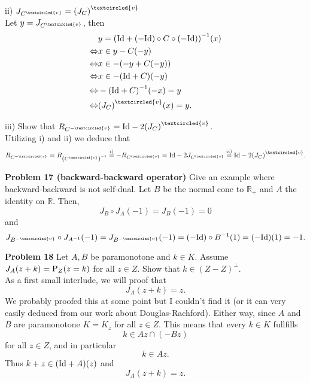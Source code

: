 \documentclass{scrartcl}
\newcommand{\R}{\mathbb{R}}
\theoremstyle{plain}
\theoremstyle{remark}
\newcommand{\Id}{\textup{Id}}
\renewcommand{\P}{\textup{P}}
\newcommand{\ov}{\textcircled{v}}
\begin{document}
ii) $J_{C^{\ov}} = {(J_{C})}^{\ov}$ \\
Let $y= J_{C^{\ov}}$, then
\begin{equation}
  \begin{aligned}
    &y= {(\Id + (-\Id) \circ C \circ (-\Id))}^{-1}(x) \\
    \Leftrightarrow& x \in y - C(-y) \\
    \Leftrightarrow& x \in - ( -y + C(-y)) \\
    \Leftrightarrow& x \in - {(\Id + C)}(-y) \\
    \Leftrightarrow& -{(\Id + C)}^{-1}(-x) = y \\
    \Leftrightarrow& {(J_{C})}^{\ov}(x) = y.
  \end{aligned}
\end{equation}

iii) Show that $R_{C^{-\ov}} = \Id - 2{(J_{C})}^{\ov}$.\\
Utilizing i) and ii) we deduce that
\begin{equation}
  R_{C^{-\ov}} = R_{\left(C^{\ov}\right)^{-1}} \overset{i)}{=} - R_{C^{\ov}} = \Id - 2 J_{C^{\ov}} \overset{ii)}{=} \Id - 2 {(J_{C})}^{\ov}.
\end{equation}



\textbf{Problem 17 (backward-backward operator)} Give an example where backward-backward is not self-dual.
Let $B$ be the normal cone to $\R_{+}$ and $A$ the identity on $\R$.
Then, 
\begin{equation}
  J_{B} \circ J_{A} (-1) = J_{B} (-1) = 0
\end{equation}
and
\begin{equation}
  J_{B^{-\ov}} \circ J_{A^{-1}} (-1) = J_{B^{-\ov}} (-1) = (-\Id) \circ B^{-1} (1) = (-\Id) (1) = -1.
\end{equation}


\textbf{Problem 18} Let $A,B$ be paramonotone and $k \in K$. Assume $J_A(z+k) = \P_Z(z=k)$ for all $z \in Z$.
Show that $k \in (Z -Z)^{\perp}$.\\
As a first small interlude, we will proof that 
\begin{equation}
  J_A(z+k) = z.
\end{equation}
We probably proofed this at some point but I couldn't find it (or it can very easily deduced from our work about Douglas-Rachford).
Either way, since $A$ and $B$ are paramonotone $K=K_z$ for all $z \in Z$.
This means that every $k \in K$ fullfills 
\begin{equation}
  k \in Az \cap (-Bz)
\end{equation}
for all $z \in Z$, and in particular 
\begin{equation}
  k \in Az.
\end{equation}
Thus $k+z \in (\Id + A)(z)$ and 
\begin{equation}
  J_A(z+k) = z.
\end{equation}\\
\end{document}
